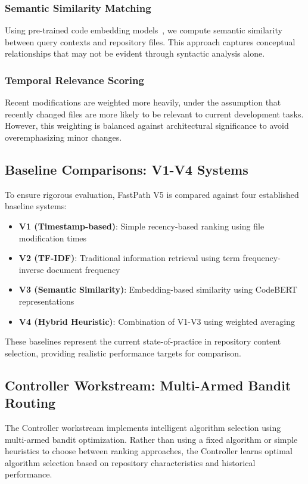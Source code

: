 \documentclass[conference]{IEEEtran}
\begin{document}
\subsubsection{Semantic Similarity Matching}
Using pre-trained code embedding models~\cite{feng2020codebert}, we compute semantic similarity between query contexts and repository files. This approach captures conceptual relationships that may not be evident through syntactic analysis alone.

\subsubsection{Temporal Relevance Scoring}
Recent modifications are weighted more heavily, under the assumption that recently changed files are more likely to be relevant to current development tasks. However, this weighting is balanced against architectural significance to avoid overemphasizing minor changes.

\subsection{Baseline Comparisons: V1-V4 Systems}

To ensure rigorous evaluation, FastPath V5 is compared against four established baseline systems:

\begin{itemize}
\item \textbf{V1 (Timestamp-based)}: Simple recency-based ranking using file modification times
\item \textbf{V2 (TF-IDF)}: Traditional information retrieval using term frequency-inverse document frequency
\item \textbf{V3 (Semantic Similarity)}: Embedding-based similarity using CodeBERT representations
\item \textbf{V4 (Hybrid Heuristic)}: Combination of V1-V3 using weighted averaging
\end{itemize}

These baselines represent the current state-of-practice in repository content selection, providing realistic performance targets for comparison.

\subsection{Controller Workstream: Multi-Armed Bandit Routing}

The Controller workstream implements intelligent algorithm selection using multi-armed bandit optimization. Rather than using a fixed algorithm or simple heuristics to choose between ranking approaches, the Controller learns optimal algorithm selection based on repository characteristics and historical performance.
\end{document}
